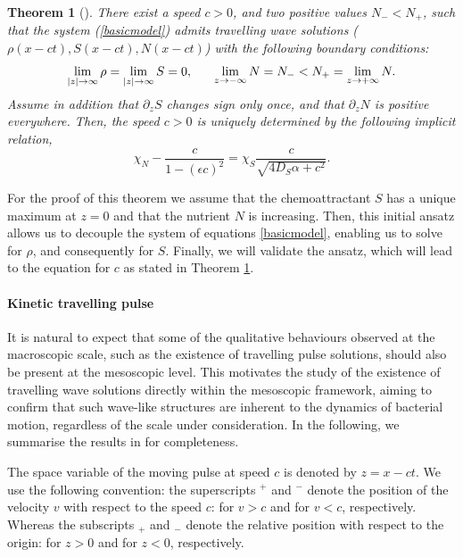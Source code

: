 \documentclass[11pt,twoside]{article}
\theoremstyle{nonumberplain}
\newtheorem{theorem}{Theorem}%
\begin{document}
\begin{theorem}[\cite{calvez2016chemotactic}]\label{thmacro}
There exist a speed $c>0$, and two positive values $N_- < N_+$, such that the system (\ref{basicmodel}) admits travelling wave solutions ($\rho (x- c t), S(x - c t), N(x - c t)$) with the following boundary conditions:
\begin{equation}
    \lim_{|z| \to \infty} \rho = \lim_{|z| \to \infty} S = 0, \hspace{0.6cm} \lim_{z \to -\infty} N = N_- < N_+ = \lim_{z \to + \infty} N.
    \nonumber
\end{equation}
Assume in addition that $\partial_z S$ changes sign only once, and that $\partial_z N$ is positive everywhere. Then, the speed $c > 0$ is uniquely determined by the following implicit relation,
\[
\chi_N - \frac{c}{1 - (\epsilon c)^2} = \chi_S \frac{c}{\sqrt{4 D_S \alpha + c^2}}.
\]
\end{theorem}

For the proof of this theorem we assume that the chemoattractant $S$ has a unique maximum at $z = 0$ and that the nutrient $N$ is increasing. Then, this initial ansatz allows us to decouple the system of equations \eqref{basicmodel}, enabling us to solve for $\rho$, and consequently for $S$. Finally, we will validate the ansatz, which will lead to the equation for $c$ as stated in Theorem \ref{thmacro}.

\paragraph{Kinetic travelling pulse} It is natural to expect that some of the qualitative behaviours observed at the macroscopic scale, such as the existence of travelling pulse solutions, should also be present at the mesoscopic level. This motivates the study of the existence of travelling wave solutions directly within the mesoscopic framework, aiming to confirm that such wave-like structures are inherent to the dynamics of bacterial motion, regardless of the scale under consideration.
In the following, we summarise the results in \cite{calvez2016chemotactic} for completeness.

The space variable of the moving pulse at speed $c$ is denoted by $z = x-ct$.
We use the following convention: the superscripts $^+$ and $^-$ denote the position of the velocity $v$ with respect to the speed $c$: for $v>c$ and for $v<c$, respectively. Whereas the subscripts $_+$ and $_-$ denote the relative position with respect to the origin: for $z>0$ and for $z<0$, respectively. 
\end{document}
